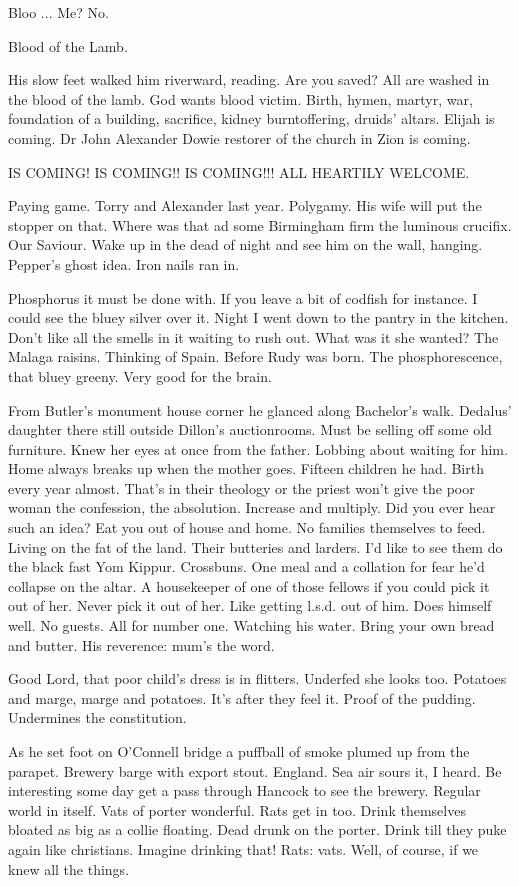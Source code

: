 Bloo ... Me? No.

Blood of the Lamb.

His slow feet walked him riverward, reading. Are you saved? All are
washed in the blood of the lamb. God wants blood victim. Birth, hymen,
martyr, war, foundation of a building, sacrifice, kidney burntoffering,
druids' altars. Elijah is coming. Dr John Alexander Dowie restorer of the
church in Zion is coming.


    IS COMING! IS COMING!! IS COMING!!!
    ALL HEARTILY WELCOME.


Paying game. Torry and Alexander last year. Polygamy. His wife will
put the stopper on that. Where was that ad some Birmingham firm the
luminous crucifix. Our Saviour. Wake up in the dead of night and see him
on the wall, hanging. Pepper's ghost idea. Iron nails ran in.

Phosphorus it must be done with. If you leave a bit of codfish for
instance. I could see the bluey silver over it. Night I went down to the
pantry in the kitchen. Don't like all the smells in it waiting to rush
out. What was it she wanted? The Malaga raisins. Thinking of Spain. Before
Rudy was born. The phosphorescence, that bluey greeny. Very good for the
brain.

From Butler's monument house corner he glanced along Bachelor's
walk. Dedalus' daughter there still outside Dillon's auctionrooms. Must be
selling off some old furniture. Knew her eyes at once from the father.
Lobbing about waiting for him. Home always breaks up when the mother
goes. Fifteen children he had. Birth every year almost. That's in their
theology or the priest won't give the poor woman the confession, the
absolution. Increase and multiply. Did you ever hear such an idea? Eat you
out of house and home. No families themselves to feed. Living on the fat
of the land. Their butteries and larders. I'd like to see them do the
black fast Yom Kippur. Crossbuns. One meal and a collation for fear he'd
collapse on the altar. A housekeeper of one of those fellows if you could
pick it out of her. Never pick it out of her. Like getting l.s.d. out of
him. Does himself well. No guests. All for number one. Watching his water.
Bring your own bread and butter. His reverence: mum's the word.

Good Lord, that poor child's dress is in flitters. Underfed she looks
too. Potatoes and marge, marge and potatoes. It's after they feel it.
Proof of the pudding. Undermines the constitution.

As he set foot on O'Connell bridge a puffball of smoke plumed up
from the parapet. Brewery barge with export stout. England. Sea air sours
it, I heard. Be interesting some day get a pass through Hancock to see the
brewery. Regular world in itself. Vats of porter wonderful. Rats get in
too. Drink themselves bloated as big as a collie floating. Dead drunk on
the porter. Drink till they puke again like christians. Imagine drinking
that! Rats: vats. Well, of course, if we knew all the things.

